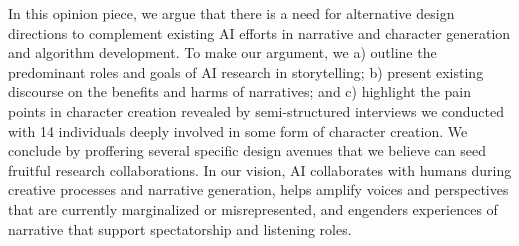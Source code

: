 In this opinion piece, we argue that there is a need for alternative design directions to complement existing AI efforts in narrative and character generation and algorithm development. To make our argument, we a) outline the predominant roles and goals of AI research in storytelling; b) present existing discourse on the benefits and harms of narratives; and c) highlight the pain points in character creation revealed by semi-structured interviews we conducted with 14 individuals deeply involved in some form of character creation. We conclude by proffering several specific design avenues that we believe can seed fruitful research collaborations. In our vision, AI collaborates with humans during creative processes and narrative generation, helps amplify voices and perspectives that are currently marginalized or misrepresented, and engenders experiences of narrative that support spectatorship and listening roles.
